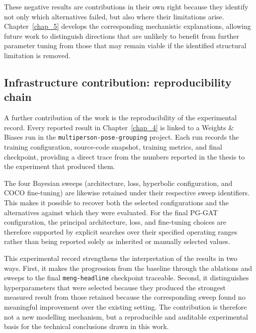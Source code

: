 These negative results are contributions in their own right because they
identify not only which alternatives failed,
but also where their limitations arise.
Chapter~\ref{chap_5} develops the corresponding mechanistic
explanations,
allowing future work to distinguish directions that are unlikely to
benefit from further parameter tuning from those that may remain viable
if the identified structural limitation is removed.

\subsection{Infrastructure contribution: reproducibility chain}
\label{sec_conc_contrib_repro}

A further contribution of the work is the reproducibility of the
experimental record.
Every reported result in Chapter~\ref{chap_4} is linked to a Weights \&
Biases run in the \texttt{multiperson-pose-grouping} project.
Each run records the training configuration,
source-code snapshot,
training metrics,
and final checkpoint,
providing a direct trace from the numbers reported in the thesis to the
experiment that produced them.

The four Bayesian sweeps (architecture,
loss,
hyperbolic configuration,
and COCO fine-tuning) are likewise retained under their respective
sweep identifiers.
This makes it possible to recover both the selected configurations and
the alternatives against which they were evaluated.
For the final PG-GAT configuration,
the principal architecture,
loss,
and fine-tuning choices are therefore supported by explicit searches
over their specified operating ranges rather than being reported solely
as inherited or manually selected values.

This experimental record strengthens the interpretation of the results
in two ways.
First, it makes the progression from the baseline through the
ablations and sweeps to the final \texttt{meng-headline} checkpoint
traceable.
Second, it distinguishes hyperparameters that were selected because
they produced the strongest measured result from those retained because
the corresponding sweep found no meaningful improvement over the
existing setting.
The contribution is therefore not a new modelling mechanism,
but a reproducible and auditable experimental basis for the technical
conclusions drawn in this work.